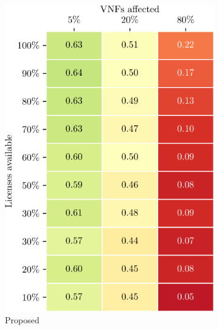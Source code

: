\begin{figure}[t!]
    \centering
    \begin{subfigure}[b]{0.48\linewidth}
        \includegraphics[width=\textwidth]{graphs/constraints/ca_NSGAII_LIM-crop}
        \caption{Proposed}
    \end{subfigure}
    \vspace{1em}
    \begin{subfigure}[b]{0.3732\linewidth}

\end{subfigure}
\end{figure}
